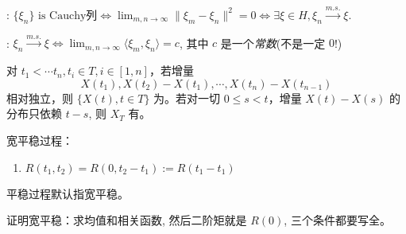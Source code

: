 : $\{\xi_n\} \text{ is Cauchy列} \Leftrightarrow \lim_{m,n\to\infty}\lVert\xi_m - \xi_n\rVert^2 = 0 \Leftrightarrow \exists \xi \in H, \xi_n \xrightarrow{m.s.} \xi$.

: $\xi_n \xrightarrow{m.s.} \xi \Leftrightarrow \lim_{m,n\to\infty}\langle\xi_m,\xi_n\rangle = c$, 其中 $c$ 是一个\emph{常数}(不是一定 $0$!)


对 $t_1 < \cdots t_n, t_i \in T, i \in [1, n]$，若增量
\begin{equation}
	X(t_1), X(t_2) - X(t_1), \cdots, X(t_n) - X(t_{n-1})
\end{equation}
相对独立，则 $\{X(t), t\in T\}$ 为。若对一切 $0 \le s < t$，增量 $X(t) - X(s)$ 的分布只依赖 $t-s$, 则 $X_T$ 有。


宽平稳过程：
\begin{enumerate}
	\item $R(t_1, t_2) = R(0, t_2 - t_1) := R(t_1 - t_1)$
\end{enumerate}

平稳过程默认指宽平稳。

证明宽平稳：求均值和相关函数, 然后二阶矩就是 $R(0)$, 三个条件都要写全。

